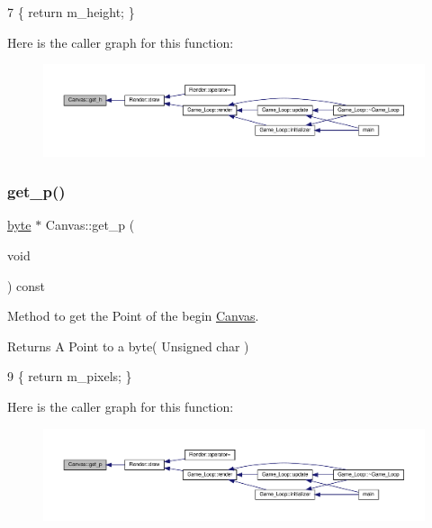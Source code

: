 \begin{DoxyCode}
7 \{ \textcolor{keywordflow}{return} m\_height; \}
\end{DoxyCode}
Here is the caller graph for this function\+:\nopagebreak
\begin{figure}[H]
\begin{center}
\leavevmode
\includegraphics[width=350pt]{classCanvas_ab26c7ab91a0a9069895285a314bc8418_icgraph}
\end{center}
\end{figure}
\mbox{\label{classCanvas_aa9f9b173d57058ea827a0134c937d0e1}} 
\subsubsection{\texorpdfstring{get\+\_\+p()}{get\_p()}}
{\footnotesize\ttfamily \hyperlink{canvas_8h_a0c8186d9b9b7880309c27230bbb5e69d}{byte} $\ast$ Canvas\+::get\+\_\+p (\begin{DoxyParamCaption}\item[{void}]{ }\end{DoxyParamCaption}) const}



Method to get the Point of the begin \hyperlink{classCanvas}{Canvas}. 

\begin{DoxyReturn}{Returns}
A Point to a byte( Unsigned char ) 
\end{DoxyReturn}

\begin{DoxyCode}
9 \{ \textcolor{keywordflow}{return} m\_pixels; \}
\end{DoxyCode}
Here is the caller graph for this function\+:\nopagebreak
\begin{figure}[H]
\begin{center}
\leavevmode
\includegraphics[width=350pt]{classCanvas_aa9f9b173d57058ea827a0134c937d0e1_icgraph}
\end{center}
\end{figure}
\mbox{\label{classCanvas_a8478392f133ddaf1c9b7272a301c7898}} 
